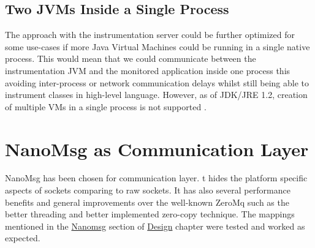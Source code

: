 \subsection{Two JVMs Inside a Single Process}
The approach with the instrumentation server could be further optimized for some use-cases if more Java Virtual Machines could be running in a single native process. This would mean that we could communicate between the instrumentation JVM and the monitored application inside one process this avoiding inter-process or network communication delays whilst still being able to instrument classes in high-level language. However, as of JDK/JRE 1.2, creation of multiple VMs in a single process is not supported \cite{MoreJVMOnceProccess}.

\section{NanoMsg as Communication Layer}
NanoMsg has been chosen for communication layer. t hides the platform specific aspects of sockets comparing to raw sockets. It has also several performance benefits and general improvements over the well-known ZeroMq such as the better threading and better implemented zero-copy technique. The mappings mentioned in the \hyperref[sec:nanomsg]{Nanomsg} section of \hyperref[chap:background]{Design} chapter were tested and worked as expected.




